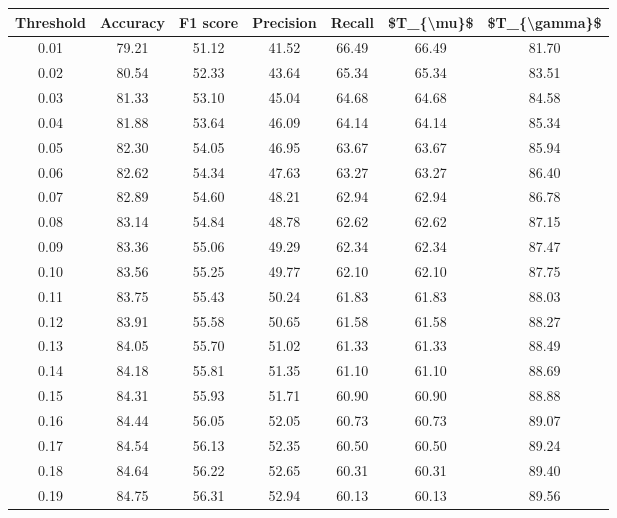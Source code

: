 \begin{tabular}{|c|c|c|c|c|c|c|}
\hline
 Threshold &  Accuracy &  F1 score &  Precision &  Recall &  \$T\_\{\textbackslash mu\}\$ &  \$T\_\{\textbackslash gamma\}\$ \\
\hline
      0.01 &     79.21 &     51.12 &      41.52 &   66.49 &      66.49 &         81.70 \\
      0.02 &     80.54 &     52.33 &      43.64 &   65.34 &      65.34 &         83.51 \\
      0.03 &     81.33 &     53.10 &      45.04 &   64.68 &      64.68 &         84.58 \\
      0.04 &     81.88 &     53.64 &      46.09 &   64.14 &      64.14 &         85.34 \\
      0.05 &     82.30 &     54.05 &      46.95 &   63.67 &      63.67 &         85.94 \\
      0.06 &     82.62 &     54.34 &      47.63 &   63.27 &      63.27 &         86.40 \\
      0.07 &     82.89 &     54.60 &      48.21 &   62.94 &      62.94 &         86.78 \\
      0.08 &     83.14 &     54.84 &      48.78 &   62.62 &      62.62 &         87.15 \\
      0.09 &     83.36 &     55.06 &      49.29 &   62.34 &      62.34 &         87.47 \\
      0.10 &     83.56 &     55.25 &      49.77 &   62.10 &      62.10 &         87.75 \\
      0.11 &     83.75 &     55.43 &      50.24 &   61.83 &      61.83 &         88.03 \\
      0.12 &     83.91 &     55.58 &      50.65 &   61.58 &      61.58 &         88.27 \\
      0.13 &     84.05 &     55.70 &      51.02 &   61.33 &      61.33 &         88.49 \\
      0.14 &     84.18 &     55.81 &      51.35 &   61.10 &      61.10 &         88.69 \\
      0.15 &     84.31 &     55.93 &      51.71 &   60.90 &      60.90 &         88.88 \\
      0.16 &     84.44 &     56.05 &      52.05 &   60.73 &      60.73 &         89.07 \\
      0.17 &     84.54 &     56.13 &      52.35 &   60.50 &      60.50 &         89.24 \\
      0.18 &     84.64 &     56.22 &      52.65 &   60.31 &      60.31 &         89.40 \\
      0.19 &     84.75 &     56.31 &      52.94 &   60.13 &      60.13 &         89.56 \\

\end{tabular}
